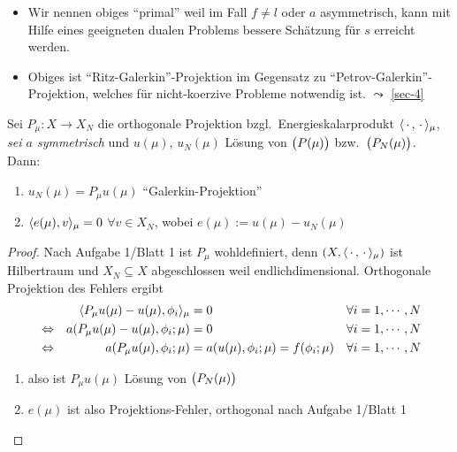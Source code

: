 \begin{bem} \beginwithlistbem
	\begin{itemize}
		\item Wir nennen obiges ``primal'' weil im Fall $f \neq l$ oder $a$ asymmetrisch, kann mit Hilfe eines geeigneten dualen Problems bessere Schätzung für $s$ erreicht werden.
		\item Obiges ist ``Ritz-Galerkin''-Projektion im Gegensatz zu ``Petrov-Galerkin''-Projektion, welches für nicht-koerzive Probleme notwendig ist. $\leadsto$ \ref{sec-4}
	\end{itemize}
\end{bem}

\begin{satz} \label{3.3}
	Sei $P_\mu : X \to X_N$ die orthogonale Projektion bzgl.\ Energieskalarprodukt $\langle \,\cdot\,, \,\cdot\, \rangle_\mu$, \emph{sei $a$ symmetrisch} und $u(\mu)$, $u_N(\mu)$ Lösung von $\big(P(\mu)\big)$ bzw.\ $\big(P_N(\mu)\big)$.
	Dann:
	\begin{enumerate}
		\item $u_N(\mu) = P_\mu u(\mu)$ ``Galerkin-Projektion''
		\item $\langle e(\mu), v \rangle_\mu = 0$ $\forall v \in X_N$, wobei $e(\mu) := u(\mu) - u_N(\mu)$
	\end{enumerate}

	\begin{proof}
		Nach Aufgabe 1/Blatt 1 ist $P_\mu$ wohldefiniert, denn $(X,\langle \,\cdot\,, \,\cdot\, \rangle_\mu)$ ist Hilbertraum und $X_N \subseteq X$ abgeschlossen weil endlichdimensional.
		Orthogonale Projektion des Fehlers ergibt
		\begin{align*}
			& & \dotp{P_\mu u(\mu) - u(\mu)}{\phi_i}_\mu &= 0 & \forall i = 1,\cdots,N &\\
			& \Leftrightarrow & a(P_\mu u(\mu) - u(\mu), \phi_i; \mu) &= 0 & \forall i = 1,\cdots,N &\\
			& \Leftrightarrow & a(P_\mu u(\mu), \phi_i; \mu) &= a(u(\mu),\phi_i;\mu) = f(\phi_i;\mu) & \forall i = 1,\cdots,N &
		\end{align*}
		\begin{enumerate}
			\item also ist $P_\mu u(\mu)$ Lösung von $\big(P_N(\mu)\big)$
			\item $e(\mu)$ ist also Projektions-Fehler, orthogonal nach Aufgabe 1/Blatt 1
		\end{enumerate}
	\end{proof}
\end{satz}

